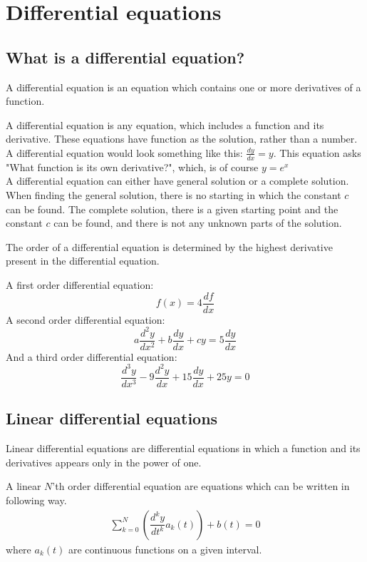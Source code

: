 \chapter{Differential equations}
\section{What is a differential equation?}
\begin{tcolorbox}[colback=blue!5!white,colframe=blue!75!black,title=Definition: Differential equation] 
A differential equation is an equation which contains one or more derivatives of a function.
\end{tcolorbox}
A differential equation is any equation, which includes a function and its derivative. These equations have function as the solution, rather than a number. 
\\
A differential equation would look something like this: $\frac{dy}{dx} = y$. This equation asks "What function is its own derivative?", which, is of course $y=e^x$
\\
A differential equation can either have general solution or a complete solution. When finding the general solution, there is no starting in which the constant $c$ can be found. The complete solution, there is a given starting point and the constant $c$ can be found, and there is not any unknown parts of the solution.
\\
\begin{tcolorbox}[colback=blue!5!white,colframe=blue!75!black,title=Definition: Order of a differential equation]
The order of a differential equation is determined by the highest derivative present in the differential equation.
\end{tcolorbox} 
\begin{tcolorbox}[colback=red!5!white,colframe=red!55!black,title=Example of differential equation of different orders] 
A first order differential equation:
$$f(x)=4\frac{df}{dx} $$
A second order differential equation:
$$a\frac{d^2y}{dx^2}+b\frac{dy}{dx}+cy = 5\frac{dy}{dx}$$
And a third order differential equation:
$$\frac{d^3y}{dx^3} - 9\frac{d^2y}{dx} + 15\frac{dy}{dx} + 25y = 0$$
\end{tcolorbox}
\section{Linear differential equations}
Linear differential equations are differential equations in which a function and its derivatives appears only in the power of one.
\begin{tcolorbox}[colback=blue!5!white,colframe=blue!75!black,title=Definition: $N$'th order linear differential equation]
A linear $N$'th order differential equation are equations which can be written in following way.
\begin{align*}
\sum_{k=0}^{N}\left(\dfrac{d^ky}{dt^k}a_k(t)\right)+b(t)=0
\end{align*}
where $a_k(t)$ are continuous functions on a given interval.  
\end{tcolorbox}
